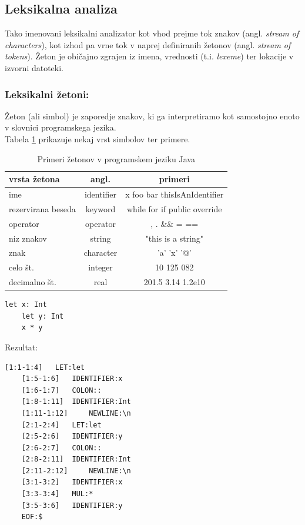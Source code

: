 \documentclass[a4paper, 12pt]{book}
\begin{document}
\subsection{Leksikalna analiza}

Tako imenovani leksikalni analizator kot vhod prejme tok znakov (angl. \textit{stream of characters}), kot izhod pa vrne tok v naprej definiranih žetonov (angl. \textit{stream of tokens}). Žeton je običajno zgrajen iz imena, vrednosti (t.i. \textit{lexeme}) ter lokacije v izvorni datoteki.  \cite{modernCompiler}

\subsubsection{Leksikalni žetoni:}

Žeton (ali simbol) je zaporedje znakov, ki ga interpretiramo kot samostojno enoto v slovnici programskega jezika. \cite{modernCompiler}\\ 
Tabela \ref{tabel:vrsteZetonov} prikazuje nekaj vrst simbolov ter primere.\\

\begin{table}
	\begin{center}
		\begin{tabular}{l|c|c}
			\textbf{vrsta žetona} & \textbf{angl.} & \textbf{primeri} \\ \hline\hline
			ime & identifier & x	foo		bar		thisIsAnIdentifier \\
			rezervirana beseda & keyword & while	for		if		public	override \\
			operator & operator & , 	. 		\&\& 	=		== \\
			niz znakov & string & "this is a string" \\
			znak & character & 'a' 		'x' 	'@' \\
			celo št. & integer & 10 	125 	082 \\
			decimalno št. & real & 201.5 	3.14	1.2e10
		\end{tabular}
	\end{center}
	\caption{Primeri žetonov v programskem jeziku Java}
	\label{tabel:vrsteZetonov}
\end{table}

\newpage

\begin{lstlisting}[caption={Primer programa v programskem jeziku Atheris},label={lst:atherisCode}, captionpos=b]
	let x: Int
	let y: Int
	x * y
\end{lstlisting}
Rezultat:
\begin{lstlisting}[caption={Rezultat leksikalne analize za program ~\ref{lst:atherisCode}},captionpos=b]
	[1:1-1:4] 	LET:let
	[1:5-1:6] 	IDENTIFIER:x
	[1:6-1:7] 	COLON::
	[1:8-1:11] 	IDENTIFIER:Int
	[1:11-1:12] 	NEWLINE:\n
	[2:1-2:4] 	LET:let
	[2:5-2:6] 	IDENTIFIER:y
	[2:6-2:7] 	COLON::
	[2:8-2:11] 	IDENTIFIER:Int
	[2:11-2:12] 	NEWLINE:\n
	[3:1-3:2] 	IDENTIFIER:x
	[3:3-3:4] 	MUL:*
	[3:5-3:6] 	IDENTIFIER:y
	EOF:$
\end{lstlisting}
\end{document}

